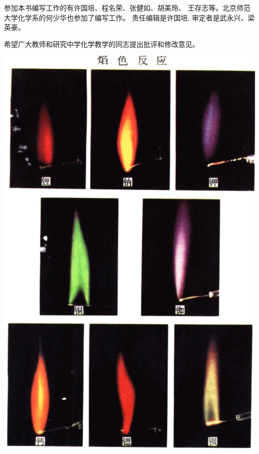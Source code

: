 \documentclass[10pt]{article}
\begin{document}
参加本书编写工作的有许国培、程名荣、张健如、胡美玲、 王存志等。北京师范大学化学系的何少华也参加了编写工作。 责任编辑是许国培, 审定者是武永兴、梁英豪。

希望广大教师和研究中学化学教学的同志提出批评和修改意见。

\begin{center}
\includegraphics[max width=1.0\textwidth]{images/01912d0f-097c-7e75-8f32-4f326cd86c9f_4_571367.jpg}
\end{center}
\end{document}
